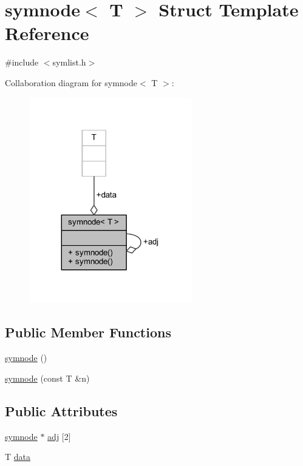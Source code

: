 \hypertarget{structsymnode}{}\section{symnode$<$ T $>$ Struct Template Reference}
\label{structsymnode}


{\ttfamily \#include $<$symlist.\+h$>$}



Collaboration diagram for symnode$<$ T $>$\+:\nopagebreak
\begin{figure}[H]
\begin{center}
\leavevmode
\includegraphics[width=200pt]{structsymnode__coll__graph}
\end{center}
\end{figure}
\subsection*{Public Member Functions}
\begin{DoxyCompactItemize}
\item 
\mbox{\hyperlink{structsymnode_a0f9b19554dc135ca2fd72fc1741b3224}{symnode}} ()
\item 
\mbox{\hyperlink{structsymnode_a30bcafe2d065258082d937d9879a6e5b}{symnode}} (const T \&n)
\end{DoxyCompactItemize}
\subsection*{Public Attributes}
\begin{DoxyCompactItemize}
\item 
\mbox{\hyperlink{structsymnode}{symnode}} $\ast$ \mbox{\hyperlink{structsymnode_aba7e8f525fb4d85417384a6ccff59241}{adj}} \mbox{[}2\mbox{]}
\item 
T \mbox{\hyperlink{structsymnode_a079c4145d1af3d5ddab2cc9c7b3e0563}{data}}
\end{DoxyCompactItemize}


